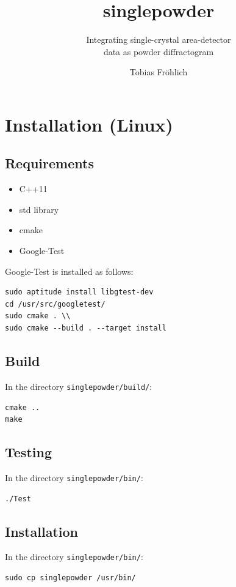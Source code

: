 \documentclass[a4paper, 12pt, twoside]{scrartcl}
\title{singlepowder}
\subtitle{Integrating single-crystal area-detector\\data as powder diffractogram}
\author{Tobias Fr\"{o}hlich}
\date{}
\begin{document}
\maketitle
\tableofcontents

\section{Installation (Linux)}


\subsection{Requirements}

\begin{itemize}
	\item C++11
	\item std library
	\item cmake
	\item Google-Test
\end{itemize}

Google-Test is installed as follows:

\begin{verbatim}
sudo aptitude install libgtest-dev
cd /usr/src/googletest/
sudo cmake . \\
sudo cmake --build . --target install
\end{verbatim}

\subsection{Build}
In the directory \verb|singlepowder/build/|:\\
\begin{verbatim}
cmake ..
make
\end{verbatim}

\subsection{Testing}
In the directory \verb|singlepowder/bin/|:\\
\begin{verbatim}
./Test
\end{verbatim}

\subsection{Installation}
In the directory \verb|singlepowder/bin/|:\\
\begin{verbatim}
sudo cp singlepowder /usr/bin/
\end{verbatim}
\end{document}

